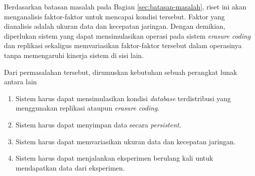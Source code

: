 Berdasarkan batasan masalah pada Bagian \ref{sec:batasan-masalah}, riset ini akan menganalisis faktor-faktor untuk mencapai kondisi tersebut. Faktor yang dianalisis adalah ukuran data dan kecepatan jaringan. Dengan demikian, diperlukan sistem yang dapat mensimulasikan operasi pada sistem \textit{erasure coding} dan replikasi sekaligus memvariasikan faktor-faktor tersebut dalam operasinya tanpa memengaruhi kinerja sistem di sisi lain.

Dari permasalahan tersebut, dirumuskan kebutuhan sebuah perangkat lunak antara lain
\begin{enumerate}

	\item Sistem harus dapat mensimulasikan kondisi \textit{database} terdistribusi yang menggunakan replikasi ataupun \textit{erasure coding}.
	\item Sistem harus dapat menyimpan data secara \textit{persistent}.
	\item Sistem harus dapat memvariasikan ukuran data dan kecepatan jaringan.
	\item Sistem harus dapat menjalankan eksperimen berulang kali untuk mendapatkan data dari eksperimen.

\end{enumerate}

